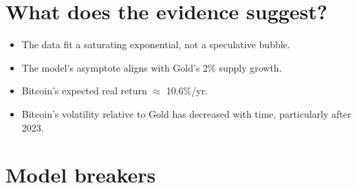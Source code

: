 \documentclass[11pt,letterpaper]{article}
\begin{document}
\section{What does the evidence suggest?}

\begin{itemize}
    \item The data fit a saturating exponential, not a speculative bubble.
    \item The model's asymptote aligns with Gold's 2\% supply growth.
    \item Bitcoin's expected real return $\approx$ 10.6\%/yr.
    \item Bitcoin's volatility relative to Gold has decreased with time, particularly after 2023.
\end{itemize}

\section{Model breakers}
\end{document}
